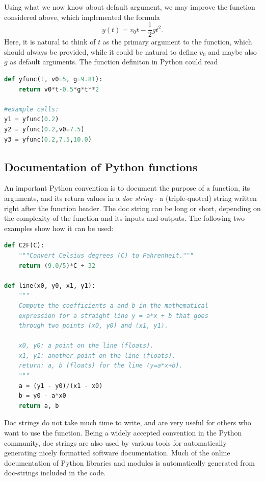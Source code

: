\documentclass[graybox,envcountchap,sectrefs,final]{svmonodo}
\begin{document}
Using what we now know about default argument, we may improve the function considered above, which implemented
the formula
\[ y(t) = v_0t- \frac{1}{2}gt^2 .\]
Here, it is natural to think of $t$ as the primary argument to the function, which should always be provided, while
it could be natural to define $v_0$ and maybe also $g$ as default arguments. The function definiton in Python
could read
\begin{lstlisting}[language=Python,style=blue1]
def yfunc(t, v0=5, g=9.81):
    return v0*t-0.5*g*t**2

#example calls:
y1 = yfunc(0.2)
y2 = yfunc(0.2,v0=7.5)
y3 = yfunc(0.2,7.5,10.0)
\end{lstlisting}

\subsection{Documentation of Python functions}

An important Python convention is to document the purpose of a
function, its arguments, and its return values in a \emph{doc string} -
a (triple-quoted) string written right after the function header.
The doc string can be long or short, depending on the complexity of the function
and its inputs and outputs. The following two examples show how it can be used:
\begin{lstlisting}[language=Python,style=blue1]
def C2F(C):
    """Convert Celsius degrees (C) to Fahrenheit."""
    return (9.0/5)*C + 32

def line(x0, y0, x1, y1):
    """
    Compute the coefficients a and b in the mathematical
    expression for a straight line y = a*x + b that goes
    through two points (x0, y0) and (x1, y1).

    x0, y0: a point on the line (floats).
    x1, y1: another point on the line (floats).
    return: a, b (floats) for the line (y=a*x+b).
    """
    a = (y1 - y0)/(x1 - x0)
    b = y0 - a*x0
    return a, b
\end{lstlisting}
Doc strings do not take much time to write, and are very useful for others who want to
use the function. Being a widely accepted convention in the Python community, doc strings
are also used by various tools for automatically generating nicely formatted software documentation.
Much of the online documentation of Python libraries and modules is automatically generated from doc-strings
included in the code.
\end{document}

